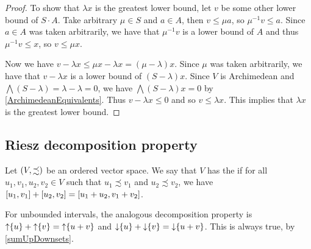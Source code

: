 \begin{proof}
To show that $\lambda x$ is the greatest lower bound, let $v$ be some other lower bound of $S\cdot A$. Take arbitrary $\mu\in S$ and $a\in A$, then $v \leq \mu a$, so $\mu^{-1}v \leq a$. Since $a\in A$ was taken arbitrarily, we have that $\mu^{-1}v$ is a lower bound of $A$ and thus $\mu^{-1}v \leq x$, so $v \leq \mu x$.

Now we have $v - \lambda x \leq \mu x - \lambda x = (\mu - \lambda) x$. Since $\mu$ was taken arbitrarily, we have that $v - \lambda x$ is a lower bound of $(S - \lambda)x$. Since $V$ is Archimedean and $\bigwedge (S - \lambda) = \lambda - \lambda = 0$, we have $\bigwedge (S - \lambda)x = 0$ by \ref{ArchimedeanEquivalents}. Thus $v - \lambda x \leq 0$ and so $v \leq \lambda x$. This implies that $\lambda x$ is the greatest lower bound.
\end{proof}


\subsection{Riesz decomposition property}
\begin{definition}
Let $\sSet{V, \precsim}$ be an ordered vector space. We say that $V$ has the  if for all $u_1,v_1,u_2,v_2\in V$ such that $u_1\precsim v_1$ and $u_2\precsim v_2$, we have $\interval{u_1,v_1} + \interval{u_2,v_2} = \interval{u_1+u_2,v_1+v_2}$.
\end{definition}

For unbounded intervals, the analogous decomposition property is $\operatorname{\uparrow}\{u\} + \operatorname{\uparrow}\{v\} = \operatorname{\uparrow}\{u+v\}$ and $\operatorname{\downarrow}\{u\} + \operatorname{\downarrow}\{v\} = \operatorname{\downarrow}\{u+v\}$. This is always true, by \ref{sumUpDownsets}.


